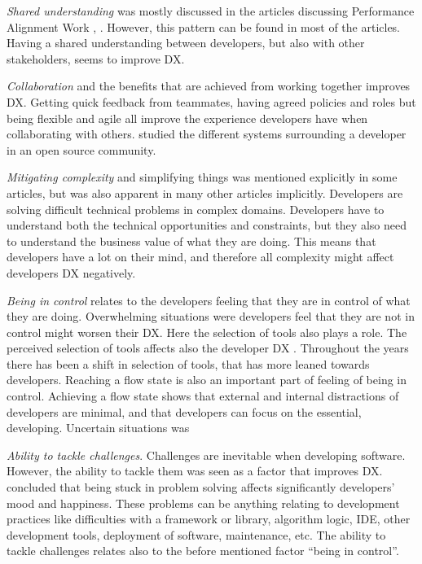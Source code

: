 \documentclass[english, 12pt, a4paper, sci, utf8, a-1b, online]{aaltothesis}
\begin{document}
\textit{Shared understanding} was mostly discussed in the articles discussing Performance Alignment Work \parencite{paw}, \parencite{how-developers-experience-team-performance}. However, this pattern can be found in most of the articles. Having a shared understanding between developers, but also with other stakeholders, seems to improve DX.

\textit{Collaboration} and the benefits that are achieved from working together improves DX. Getting quick feedback from teammates, having agreed policies and roles but being flexible and agile all improve the experience developers have when collaborating with others. \textcite{entering-an-ecosystem} studied the different systems surrounding a developer in an open source community.

\textit{Mitigating complexity} and simplifying things was mentioned explicitly in some articles, but was also apparent in many other articles implicitly. Developers are solving difficult technical problems in complex domains. Developers have to understand both the technical opportunities and constraints, but they also need to understand the business value of what they are doing. This means that developers have a lot on their mind, and therefore all complexity might affect developers DX negatively.

\textit{Being in control} relates to the developers feeling that they are in control of what they are doing. Overwhelming situations were developers feel that they are not in control might worsen their DX. Here the selection of tools also plays a role. The perceived selection of tools affects also the developer DX \parencite{software-developers-as-users}. Throughout the years there has been a shift in selection of tools, that has more leaned towards developers. Reaching a flow state is also an important part of feeling of being in control. Achieving a flow state shows that external and internal distractions of developers are minimal, and that developers can focus on the essential, developing. Uncertain situations was

\textit{Ability to tackle challenges}. Challenges are inevitable when developing software. However, the ability to tackle them was seen as a factor that improves DX. \textcite{what-happens-when-unhappy} concluded that being stuck in problem solving affects significantly developers' mood and happiness. These problems can be anything relating to development practices like difficulties with a framework or library, algorithm logic, IDE, other development tools, deployment of software, maintenance, etc. The ability to tackle challenges relates also to the before mentioned factor ``being in control''.
\end{document}
